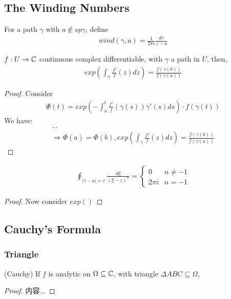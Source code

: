 \documentclass[Total.tex]{subfiles}
\begin{document}
			\subsection{The Winding Numbers}
				\begin{Def}
					For a path $\gamma$ with $a\notin sp\gamma$, define
					\begin{gather*}
						wind(\gamma,a)=\frac{1}{2\pi i} \frac{d\gamma}{z-a}
					\end{gather*}
				\end{Def}
				\begin{lemma}
					$f:U\rightarrow \mathbb{C}$ continuous complex differentiable, with $\gamma$ a path in $U$, then,
					\begin{gather*}
						exp(\int_\gamma \frac{f'}{f}(z)dz)=\frac{f(\gamma(b))}{f(\gamma(a))}
					\end{gather*}
				\end{lemma}
				\begin{proof}
					Consider 
					\begin{gather*}
						\Phi(t)=exp(-\int_a^t \frac{f'}{f}(\gamma(s))\gamma'(s)ds)\cdot f(\gamma(t)) 
					\end{gather*}
					We have:
					\begin{gather*}
						...\\
						\Rightarrow \Phi(a)=\Phi(b),exp(\int_\gamma \frac{f'}{f}(z)dz)=\frac{f(\gamma(b))}{f(\gamma(a))}
					\end{gather*}
				\end{proof}
				\begin{proposition}
					\begin{gather*}
						\oint_{|\gamma-a|=r} \frac{d\xi}{(\xi-z)^n}=\begin{cases}
							0&n\not=-1\\
							2\pi i&n=-1
						\end{cases}
					\end{gather*}
				\end{proposition}
				\begin{proof}
					Now consider $exp()$
				\end{proof}
			\subsection{Cauchy's Formula}
				\subsubsection{Triangle}
					\begin{theorem}
						(Cauchy) If $f$ is analytic on $\Omega\subseteq \mathbb{C}$, with triangle $\Delta ABC\subseteq \Omega$,
					\end{theorem}
					\begin{proof}
						内容...
					\end{proof}
\end{document}
